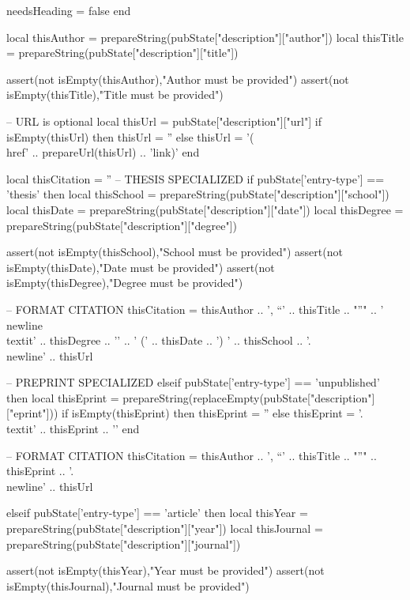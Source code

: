 \documentclass[letterpaper, 10pt]{article}
\begin{document}
\begin{luacode}
					needsHeading = false
				end

				local thisAuthor 	= prepareString(pubState["description"]["author"])
				local thisTitle 	= prepareString(pubState["description"]["title"])

				assert(not isEmpty(thisAuthor),"Author must be provided")
				assert(not isEmpty(thisTitle),"Title must be provided")

				-- URL is optional
				local thisUrl = pubState["description"]["url"]
				if isEmpty(thisUrl) then
					thisUrl = ''
				else
					thisUrl = '(\\href{' .. prepareUrl(thisUrl) .. '}{link})'
				end

				local thisCitation = ''
				-- THESIS SPECIALIZED
				if pubState['entry-type'] == 'thesis' then
					local thisSchool = prepareString(pubState["description"]["school"])
					local thisDate = prepareString(pubState["description"]["date"])
					local thisDegree = prepareString(pubState["description"]["degree"])

					assert(not isEmpty(thisSchool),"School must be provided")
					assert(not isEmpty(thisDate),"Date must be provided")
					assert(not isEmpty(thisDegree),"Degree must be provided")

					-- FORMAT CITATION
					thisCitation = thisAuthor .. ', ``' .. thisTitle .. "''" ..
					'\\newline \\textit{' .. thisDegree .. '}' .. ' (' .. thisDate .. ') ' .. thisSchool ..
					'.\\newline' .. thisUrl


				-- PREPRINT SPECIALIZED
				elseif pubState['entry-type'] == 'unpublished' then
					local thisEprint = prepareString(replaceEmpty(pubState["description"]["eprint"]))
					if isEmpty(thisEprint) then
						thisEprint = ''
					else
						thisEprint = '. \\textit{' .. thisEprint .. '}'
					end

					-- FORMAT CITATION
					thisCitation = thisAuthor .. ', ``' .. thisTitle .. "''" .. thisEprint ..
					'.\\newline' .. thisUrl

				elseif pubState['entry-type'] == 'article' then
					local thisYear = prepareString(pubState["description"]["year"])
					local thisJournal = prepareString(pubState["description"]["journal"])

					assert(not isEmpty(thisYear),"Year must be provided")
					assert(not isEmpty(thisJournal),"Journal must be provided")


\end{luacode}
\end{document}
